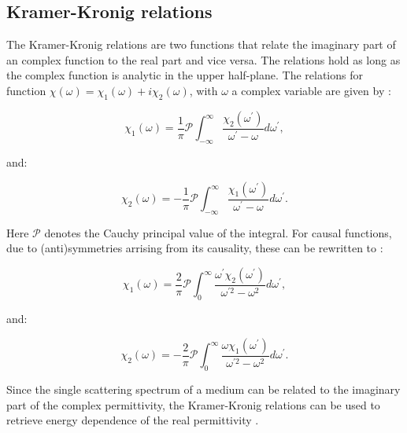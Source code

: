 \newpage

\subsection{Kramer-Kronig relations} \label{sect_K_K}
The Kramer-Kronig relations are two functions that relate the imaginary part of an complex function to the real part and vice versa. The relations hold as long as the complex function is analytic in the upper half-plane.
The relations for function $\chi(\omega)=\chi_{1}(\omega)+i \chi_{2}(\omega)$, with $\omega$ a complex variable are given by \cite{wikipedia_2020}:

\begin{equation}
    \chi_{1}(\omega)=\frac{1}{\pi} \mathcal{P} \int_{-\infty}^{\infty} \frac{\chi_{2}\left(\omega^{\prime}\right)}{\omega^{\prime}-\omega} d \omega^{\prime},
\end{equation}

and:

\begin{equation}
    \chi_{2}(\omega)=-\frac{1}{\pi} \mathcal{P} \int_{-\infty}^{\infty} \frac{\chi_{1}\left(\omega^{\prime}\right)}{\omega^{\prime}-\omega} d \omega^{\prime}.
\end{equation}

Here $\mathcal{P}$ denotes the Cauchy principal value of the integral. For causal functions, due to (anti)symmetries arrising from its causality, these can be rewritten to \cite{wikipedia_2020}:

\begin{equation}\label{eq_ch1_1}
    \chi_{1}(\omega)=\frac{2}{\pi} \mathcal{P} \int_{0}^{\infty} \frac{\omega^{\prime} \chi_{2}\left(\omega^{\prime}\right)}{\omega^{\prime 2}-\omega^{2}} d \omega^{\prime},
\end{equation}

and:

\begin{equation}
    \chi_{2}(\omega)=-\frac{2}{\pi} \mathcal{P} \int_{0}^{\infty} \frac{\omega \chi_{1}\left(\omega^{\prime}\right)}{\omega^{\prime 2}-\omega^{2}} d \omega^{\prime}.
\end{equation}


Since the single scattering spectrum of a medium can be related to the imaginary part of the complex permittivity, the Kramer-Kronig relations can be used to retrieve energy dependence of the real permittivity \cite{egerton_book}. 




